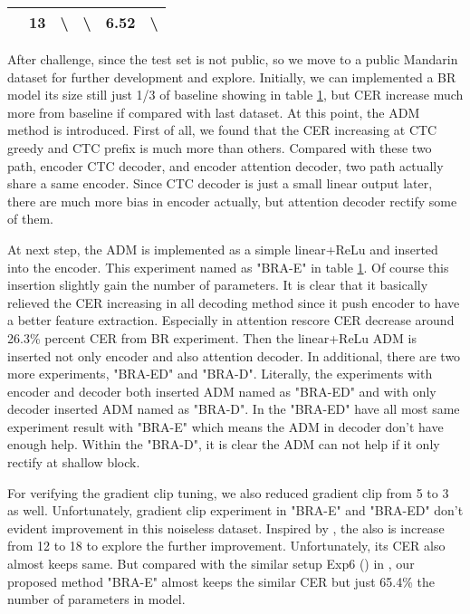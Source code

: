 \documentclass{INTERSPEECH2023}
\begin{document}
\begin{table}[]
\begin{tabular}{|c|c|cccc|}
\multicolumn{1}{|c|}{\cite{gao2021extremely}}  & 13                        & \multicolumn{1}{c|}{\textbackslash}           & \multicolumn{1}{c|}{\textbackslash}           & \multicolumn{1}{c|}{6.52}      & \multicolumn{1}{c|}{\textbackslash} \\ \hline
\end{tabular} 
\label{table: CER_AISELL_test}
\end{table} After challenge, since the test set is not public, so we move to a public Mandarin dataset for further development and explore. Initially, we can implemented a BR model its size still just 1/3 of baseline showing in table \ref{table: CER_AISELL_test}, but CER increase much more from baseline if compared with last dataset. At this point, the ADM method is introduced. First of all, we found that the CER increasing at CTC greedy and CTC prefix is much more than others. Compared with these two path, encoder  CTC decoder, and encoder  attention decoder, two path actually share a same encoder. Since CTC decoder is just a small linear output later, there are much more bias in encoder actually, but attention decoder rectify some of them. 

At next step, the ADM is implemented as a simple linear+ReLu and inserted into the encoder. This experiment named as "BRA-E" in table \ref{table: CER_AISELL_test}. Of course this insertion slightly gain the number of parameters. It is clear that it basically relieved the CER increasing in all decoding method since it push encoder to have a better feature extraction. Especially in attention rescore CER decrease around 26.3\% percent CER from BR experiment. Then the linear+ReLu ADM is inserted not only encoder and also attention decoder. In additional, there are two more experiments, "BRA-ED" and "BRA-D". Literally, the experiments with encoder and decoder both inserted ADM named as "BRA-ED" and with only decoder inserted ADM named as "BRA-D". In the "BRA-ED" have all most same experiment result with "BRA-E" which means the ADM in decoder don't have enough help. Within the "BRA-D", it is clear the ADM can not help if it only rectify at shallow block.


For verifying the gradient clip tuning, we also reduced gradient clip from 5 to 3 as well. Unfortunately, gradient clip experiment in "BRA-E" and "BRA-ED" don't evident improvement in this noiseless dataset. Inspired by \cite{gao2021extremely, lan2019albert}, the  also is increase from 12 to 18 to explore the further improvement. Unfortunately, its CER also almost keeps same. But compared with the similar setup Exp6 () in \cite{gao2021extremely}, our proposed method "BRA-E" almost keeps the similar CER but just 65.4\% the number of parameters in model. 
\end{document}
